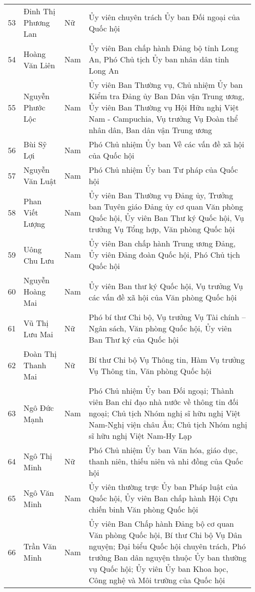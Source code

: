 \begin{longtable}{p{}p{}p{}p{}}
53 &
  Đinh Thị Phương Lan &
  Nữ &
  Ủy viên chuyên trách Ủy ban Đối ngoại của Quốc hội \\
54 &
  Hoàng Văn Liên &
  Nam &
  Ủy viên Ban chấp hành Đảng bộ tỉnh Long An, Phó Chủ tịch Ủy ban nhân dân tỉnh Long An \\
55 &
  Nguyễn Phước Lộc &
  Nam &
  Ủy viên Ban Thường vụ, Chủ nhiệm Ủy ban Kiểm tra Đảng ủy Ban Dân vận Trung ương, Ủy viên Ban Thường vụ Hội Hữu nghị Việt Nam - Campuchia, Vụ trưởng Vụ Đoàn thể nhân dân, Ban dân vận Trung ương \\
56 &
  Bùi Sỹ Lợi &
  Nam &
  Phó Chủ nhiệm Ủy ban Về các vấn đề xã hội của Quốc hội \\
57 &
  Nguyễn Văn Luật &
  Nam &
  Phó Chủ nhiệm Ủy ban Tư pháp của Quốc hội \\
58 &
  Phan Viết Lượng &
  Nam &
  Ủy viên Ban Thường vụ Đảng ủy, Trưởng ban Tuyên giáo Đảng ủy cơ quan Văn phòng Quốc hội, Ủy viên Ban Thư ký Quốc hội, Vụ trưởng Vụ Tổng hợp, Văn phòng Quốc hội \\
59 &
  Uông Chu Lưu &
  Nam &
  Ủy viên Ban chấp hành Trung ương Đảng, Ủy viên Đảng đoàn Quốc hội, Phó Chủ tịch Quốc hội \\
60 &
  Nguyễn Hoàng Mai &
  Nam &
  Ủy viên Ban thư ký Quốc hội, Vụ trưởng Vụ các vấn đề xã hội của Văn phòng Quốc hội \\
61 &
  Vũ Thị Lưu Mai &
  Nữ &
  Phó bí thư Chi bộ, Vụ trưởng Vụ Tài chính – Ngân sách, Văn phòng Quốc hội, Ủy viên Ban Thư ký của Quốc hội \\
62 &
  Đoàn Thị Thanh Mai &
  Nữ &
  Bí thư Chi bộ Vụ Thông tin, Hàm Vụ trưởng Vụ Thông tin, Văn phòng Quốc hội \\
63 &
  Ngô Đức Mạnh &
  Nam &
  Phó Chủ nhiệm Ủy ban Đối ngoại; Thành viên Ban chỉ đạo nhà nước về thông tin đối ngoại; Chủ tịch Nhóm nghị sĩ hữu nghị Việt Nam-Nghị viện châu Âu; Chủ tịch Nhóm nghị sĩ hữu nghị Việt Nam-Hy Lạp \\
64 &
  Ngô Thị Minh &
  Nữ &
  Phó Chủ nhiệm Ủy ban Văn hóa, giáo dục, thanh niên, thiếu niên và nhi đồng của Quốc hội \\
65 &
  Ngô Văn Minh &
  Nam &
  Ủy viên thường trực Ủy ban Pháp luật của Quốc hội, Ủy viên Ban chấp hành Hội Cựu chiến binh Văn phòng Quốc hội \\
66 &
  Trần Văn Minh &
  Nam &
  Ủy viên Ban Chấp hành Đảng bộ cơ quan Văn phòng Quốc hội, Bí thư Chi bộ Vụ Dân nguyện; Đại biểu Quốc hội chuyên trách, Phó trưởng Ban dân nguyện thuộc Ủy ban thường vụ Quốc hội; Ủy viên Ủy ban Khoa học, Công nghệ và Môi trường của Quốc hội \\

\end{longtable}
